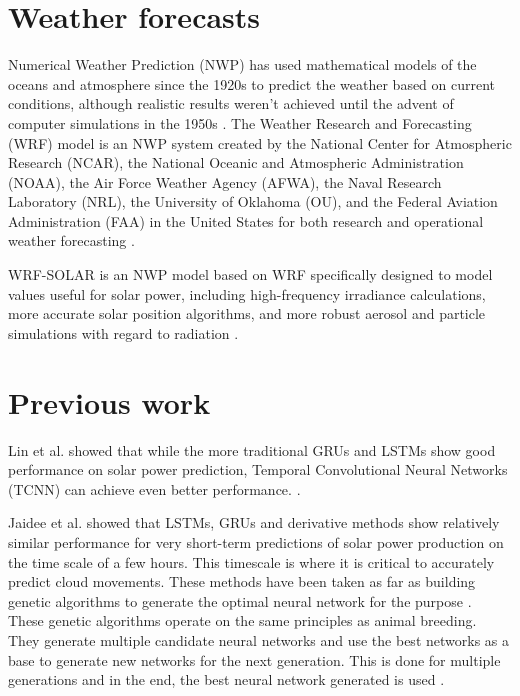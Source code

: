\section{Weather forecasts\label{cha:WRF}}
Numerical Weather Prediction (NWP) has used mathematical models of the oceans and atmosphere since the 1920s to predict the weather based on current conditions, although realistic results weren't achieved until the advent of computer simulations in the 1950s \cite{noauthor_numerical_2022}. The Weather Research and Forecasting (WRF) model is an NWP system created by the National Center for Atmospheric Research (NCAR), the National Oceanic and Atmospheric Administration (NOAA), the Air Force Weather Agency (AFWA), the Naval Research Laboratory (NRL), the University of Oklahoma (OU), and the Federal Aviation Administration (FAA) in the United States for both research and operational weather forecasting \cite{noauthor_weather_2022}.

WRF-SOLAR is an NWP model based on WRF specifically designed to model values useful for solar power, including high-frequency irradiance calculations, more accurate solar position algorithms, and more robust aerosol and particle simulations with regard to radiation \cite{jimenez_wrf-solar_2016}.
\section{Previous work}
Lin et al. \cite{lin_temporal_2020} showed that while the more traditional GRUs and LSTMs show good performance on solar power prediction, Temporal Convolutional Neural Networks (TCNN) can achieve even better performance. \textit{} \cite{lin_temporal_2020}.

Jaidee et al. \cite{jaidee_very_2019} showed that LSTMs, GRUs and derivative methods show relatively similar performance for very short-term predictions of solar power production on the time scale of a few hours. This timescale is where it is critical to accurately predict cloud movements. 
These methods have been taken as far as building genetic algorithms to generate the optimal neural network for the purpose \cite{jaidee_very_2019}. These genetic algorithms operate on the same principles as animal breeding. They generate multiple candidate neural networks and use the best networks as a base to generate new networks for the next generation. This is done for multiple generations and in the end, the best neural network generated is used \cite{jaidee_very_2019}.

